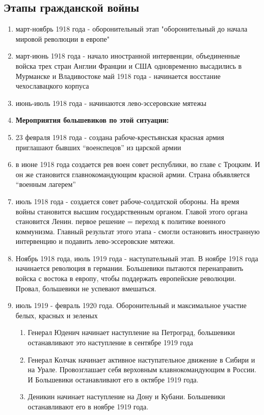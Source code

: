 \documentclass[a4paper]{article}
\begin{document}
\subsection{Этапы гражданской войны}
\begin{enumerate}
    \item март-ноябрь 1918 года - оборонительный этап "оборонительный до начала мировой революции в европе"
    \item март-июнь 1918 года - начало иностранной интервенции, объединенные войска трех стран Англии Франции и США одновременно высадились в Мурманске и Владивостоке
    май 1918 года - начинается восстание чехославацкого корпуса
    \item июнь-июль 1918 года - начинаются лево-эссеровские мятежы
    \item \textbf{Мероприятия большевиков по этой ситуации:}
    \item 23 февраля 1918 года - создана рабоче-крестьянская красная армия
    приглашают бывших ``военспецов'' из царской армии
    \item в июне 1918 года создается рев воен совет республики, во главе с Троцким. И он же становится главнокомандующим красной армии. Страна объявляется ``военным лагерем''
    \item июль 1918 года - создается совет рабоче-солдатской обороны. На время войны становится высшим государственным органом. Главой этого органа становится Ленин. первое решение = переход к политике военного коммунизма. Главный результат этого этапа - смогли остановить иностранную интервенцию и подавить лево-эссеровские мятежи.
    \item  Ноябрь 1918 года, июль 1919 года - наступательный этап. В ноябре 1918 года начинается революция в германии. Большевики пытаются перенаправить войска с востока в европу, чтобы поддержать европейские революции. Провал, большевики не успевают вмешаться.
    \item июль 1919 - февраль 1920 года. Оборонительный и максимальное участие белых, красных и зеленых
    \begin{enumerate}
        \item Генерал Юденич начинает наступление на Петроград, большевики останавливают это наступление в сентябре 1919 года
        \item Генерал Колчак начинает активное наступательное движение в Сибири и на Урале. Провозглашает себя верховным клавнокомандующим в России. И Большевики останавливают его в октябре 1919 года.
        \item Деникин начинает наступление на Дону и Кубани. Большевики останавливают его в ноябре 1919 года.

\end{enumerate}
\end{enumerate}
\end{document}
